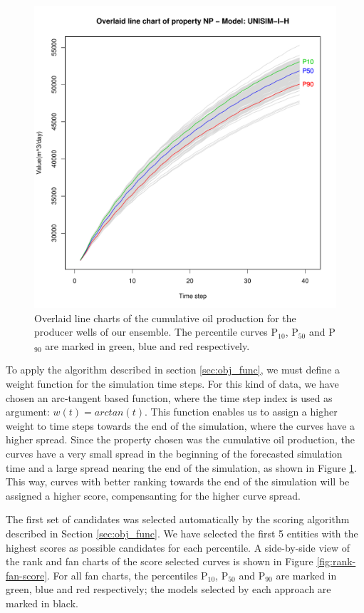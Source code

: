 \documentclass[final,5p,times,twocolumn]{elsarticle}
\begin{document}
\begin{figure}[H]
  \centering
  \includegraphics[width=\columnwidth]{np-spag.pdf}
  \caption{Overlaid line charts of the cumulative oil production for the producer wells of our ensemble. The percentile curves P$_{10}$, P$_{50}$ and P$_{90}$ are marked in green, blue and red respectively.}
  \label{fig:np-chart}
\end{figure}

To apply the algorithm described in section \ref{sec:obj_func}, we must define a weight function for the simulation time steps. For this kind of data, we have chosen an arc-tangent based function, where the time step index is used as argument: $w(t) = arctan(t)$. This function enables us to assign a higher weight to time steps towards the end of the simulation, where the curves have a higher spread. Since the property chosen was the cumulative oil production, the curves have a very small spread in the beginning of the forecasted simulation time and a large spread nearing the end of the simulation, as shown in Figure \ref{fig:np-chart}. This way, curves with better ranking towards the end of the simulation will be assigned a higher score, compensanting for the higher curve spread.

The first set of candidates was selected automatically by the scoring algorithm described in Section \ref{sec:obj_func}. We have selected the first 5 entities with the highest scores as possible candidates for each percentile. A side-by-side view of the rank and fan charts of the score selected curves is shown in Figure \ref{fig:rank-fan-score}. For all fan charts, the percentiles P$_{10}$, P$_{50}$ and P$_{90}$ are marked in green, blue and red respectively; the models selected by each approach are marked in black.
\end{document}
